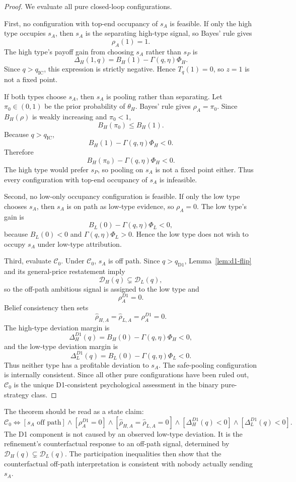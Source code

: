 \begin{proof}
We evaluate all pure closed-loop configurations.

First, no configuration with top-end occupancy of \(s_A\) is feasible. If only the high type occupies \(s_A\), then \(s_A\) is the separating high-type signal, so Bayes' rule gives
\[
\rho_A(1)=1.
\]
The high type's payoff gain from choosing \(s_A\) rather than \(s_P\) is
\[
\Delta_H(1,q)=B_H(1)-\Gamma(q,\eta)\Phi_H.
\]
Since \(q>q_{\mathrm{IC}}\), this expression is strictly negative. Hence \(T_q(1)=0\), so \(z=1\) is not a fixed point.

If both types choose \(s_A\), then \(s_A\) is pooling rather than separating. Let \(\pi_0\in(0,1)\) be the prior probability of \(\theta_H\). Bayes' rule gives \(\rho_A=\pi_0\). Since \(B_H(\rho)\) is weakly increasing and \(\pi_0<1\),
\[
B_H(\pi_0)\le B_H(1).
\]
Because \(q>q_{\mathrm{IC}}\),
\[
B_H(1)-\Gamma(q,\eta)\Phi_H<0.
\]
Therefore
\[
B_H(\pi_0)-\Gamma(q,\eta)\Phi_H<0.
\]
The high type would prefer \(s_P\), so pooling on \(s_A\) is not a fixed point either. Thus every configuration with top-end occupancy of \(s_A\) is infeasible.

Second, no low-only occupancy configuration is feasible. If only the low type chooses \(s_A\), then \(s_A\) is on path as low-type evidence, so \(\rho_A=0\). The low type's gain is
\[
B_L(0)-\Gamma(q,\eta)\Phi_L<0,
\]
because \(B_L(0)<0\) and \(\Gamma(q,\eta)\Phi_L>0\). Hence the low type does not wish to occupy \(s_A\) under low-type attribution.

Third, evaluate \(\mathcal C_0\). Under \(\mathcal C_0\), \(s_A\) is off path. Since \(q>q_{\mathrm{D1}}\), Lemma~\ref{lem:d1-flip} and its general-price restatement imply
\[
\mathcal D_H(q)\subsetneq \mathcal D_L(q),
\]
so the off-path ambitious signal is assigned to the low type and
\[
\rho_A^{D1}=0.
\]
Belief consistency then sets
\[
\widehat\rho_{H,A}=\widehat\rho_{L,A}=\rho_A^{D1}=0.
\]
The high-type deviation margin is
\[
\Delta_H^{D1}(q)=B_H(0)-\Gamma(q,\eta)\Phi_H<0,
\]
and the low-type deviation margin is
\[
\Delta_L^{D1}(q)=B_L(0)-\Gamma(q,\eta)\Phi_L<0.
\]
Thus neither type has a profitable deviation to \(s_A\). The safe-pooling configuration is internally consistent. Since all other pure configurations have been ruled out, \(\mathcal C_0\) is the unique D1-consistent psychological assessment in the binary pure-strategy class.
\end{proof}

The theorem should be read as a state claim:
\[
\mathcal C_0
\Longleftrightarrow
\left[
s_A\text{ off path}
\right]
\wedge
\left[
\rho_A^{D1}=0
\right]
\wedge
\left[
\widehat\rho_{H,A}=\widehat\rho_{L,A}=0
\right]
\wedge
\left[
\Delta_H^{D1}(q)<0
\right]
\wedge
\left[
\Delta_L^{D1}(q)<0
\right].
\]
The D1 component is not caused by an observed low-type deviation. It is the refinement's counterfactual response to an off-path signal, determined by \(\mathcal D_H(q)\subsetneq\mathcal D_L(q)\). The participation inequalities then show that the counterfactual off-path interpretation is consistent with nobody actually sending \(s_A\).


